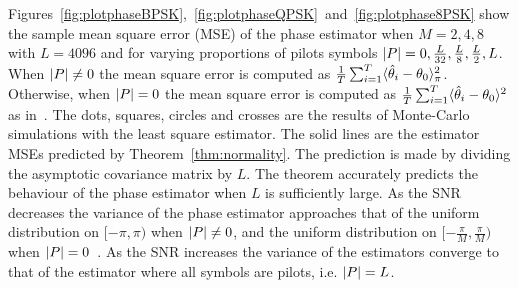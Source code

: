 \documentclass[journal]{IEEEtran}
\begin{document}
Figures~\ref{fig:plotphaseBPSK},~\ref{fig:plotphaseQPSK}~and~\ref{fig:plotphase8PSK} show the sample mean square error (MSE) of the phase estimator when $M=2,4,8$ with $L=4096$ and for varying proportions of pilots symbols ${\left\vert P \right\vert} = 0, \tfrac{L}{32}, \tfrac{L}{8}, \tfrac{L}{2}, L$.  When ${\left\vert P \right\vert} \neq 0$ the mean square error is computed as $\tfrac{1}{T}\sum_{i=1}^T\langle \hat{\theta}_i - \theta_0 \rangle_\pi^2$.  Otherwise, when ${\left\vert P \right\vert}=0$ the mean square error is computed as $\tfrac{1}{T}\sum_{i=1}^T\langle \hat{\theta}_i - \theta_0 \rangle^2$ as in~\cite{McKilliam_leastsqPSKnoncoICASSP_2012}.  The dots, squares, circles and crosses are the results of Monte-Carlo simulations with the least square estimator.  The solid lines are the estimator MSEs predicted by Theorem~\ref{thm:normality}.   %
The prediction is made by dividing the asymptotic covariance matrix by $L$.  The theorem accurately predicts the behaviour of the phase estimator when $L$ is sufficiently large.  As the SNR decreases the variance of the phase estimator approaches that of the uniform distribution on $[-\pi, \pi)$ when ${\left\vert P \right\vert} \neq 0$, and the uniform distribution on $[-\tfrac{\pi}{M}, \tfrac{\pi}{M})$ when ${\left\vert P \right\vert}=0$~\cite{McKilliam_leastsqPSKnoncoICASSP_2012}.  As the SNR increases the variance of the estimators converge to that of the estimator where all symbols are pilots, i.e. ${\left\vert P \right\vert} = L$.

\end{document}
